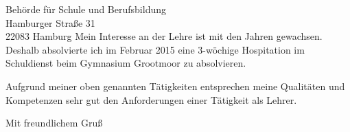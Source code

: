 \documentclass[ebner,paper=a4,fontsize=11pt,ngerman,BCOR=10mm]{scrlttr2}%
\begin{document}
\begin{letter}{ Beh{\"o}rde f{\"u}r Schule und Berufsbildung\\
Hamburger Stra{\ss}e 31\\ 
22083 Hamburg}
Mein Interesse an der Lehre ist mit den Jahren gewachsen. Deshalb absolvierte
ich im Februar 2015 eine 3-w{\"o}chige Hospitation im Schuldienst beim
Gymnasium Grootmoor zu absolvieren.


%

Aufgrund meiner oben genannten T{\"a}tigkeiten entsprechen meine Qualit{\"a}ten und
Kompetenzen sehr gut den Anforderungen einer T{\"a}tigkeit als Lehrer. 


\closing{Mit freundlichem Gru\ss}
\enlargethispage{6\baselineskip}

\end{letter}
\end{document}
